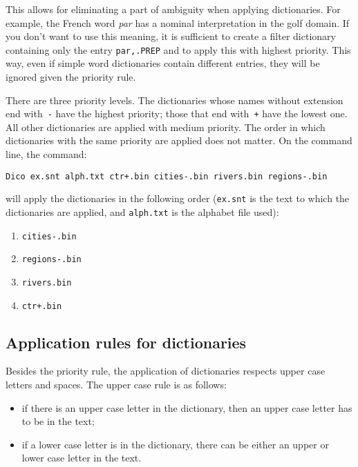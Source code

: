 \bigskip
\noindent This allows for eliminating a part of ambiguity when applying
dictionaries. For example, the French word \textit{par} has a nominal interpretation in the golf
domain. If you don't want to use this meaning, it is sufficient to create a
filter dictionary containing only the entry \verb$par,.PREP$ and to apply this
with highest priority. This way, even if simple word dictionaries contain 
different entries, they will be ignored given the priority rule.

\bigskip
\noindent There are three priority levels. The dictionaries whose names without
extension end with~\verb+-+
\index{\verbc{-}}\index{\verbc{+}}
have the highest priority; those that end with~\verb-+- have the lowest one.
All other dictionaries are applied with medium priority. The order in which
dictionaries with the same priority are applied does not matter.
On the command line, the command:

\bigskip
\noindent
\verb$Dico ex.snt alph.txt ctr+.bin cities-.bin rivers.bin regions-.bin$

\bigskip \noindent will apply the dictionaries in the following order
(\verb+ex.snt+ is the text to which the dictionaries are applied, and 
\verb+alph.txt+ is the alphabet file used):

\bigskip
\begin{enumerate}
  \item \verb$cities-.bin$
  \item \verb$regions-.bin$
  \item \verb$rivers.bin$
  \item \verb$ctr+.bin$
\end{enumerate}

\subsection{Application rules for dictionaries}
\label{section-transducer-application-rules}

Besides the priority rule, the application of dictionaries respects  upper  case
letters and spaces. The upper case rule is as follows:

\begin{itemize}
  \item if there is an upper case letter in the dictionary, then an upper case
  letter has to be in the text;
  
  \item if a lower case letter is in the dictionary, there can be either an upper
  or lower case letter in the text.
\end{itemize}

